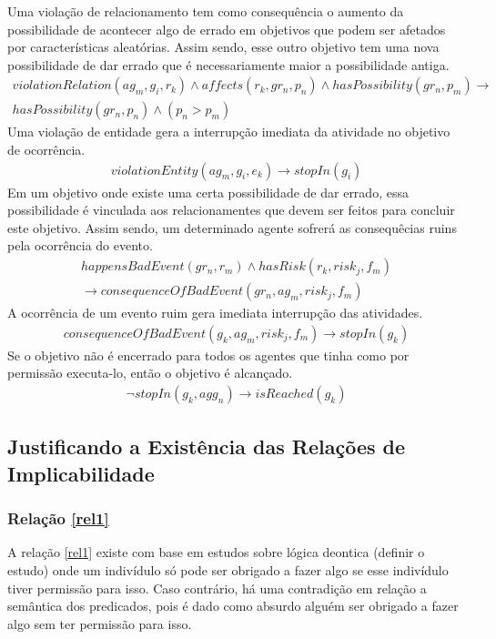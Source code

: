 \documentclass[12pt]{article}
\begin{document}
Uma violação de relacionamento tem como consequência o aumento da possibilidade de acontecer algo de errado em objetivos que podem ser afetados por características aleatórias. Assim sendo, esse outro objetivo tem uma nova possibilidade de dar errado que é necessariamente maior a possibilidade antiga.
\begin{eqnarray}\nonumber
	violationRelation(ag_m,g_i,r_k) \wedge affects(r_k,gr_n,p_n) \wedge hasPossibility(gr_n,p_m) \to \\  
	hasPossibility(gr_n,p_n) \wedge (p_n > p_m)
\end{eqnarray}
Uma violação de entidade gera a interrupção imediata da atividade no objetivo de ocorrência.
\begin{eqnarray}
	violationEntity(ag_m,g_i,e_k) \to stopIn(g_i)
\end{eqnarray}
 Em um objetivo onde existe uma certa possibilidade de dar errado, essa possibilidade é vinculada aos relacionamentes que devem ser feitos para concluir este objetivo. Assim sendo, um determinado agente sofrerá as consequêcias ruins pela ocorrência do evento.
\begin{eqnarray}\nonumber
	happensBadEvent(gr_n,r_m) \wedge hasRisk(r_k,risk_j,f_m) \nonumber \\ 
	\to consequenceOfBadEvent(gr_n,ag_m,risk_j,f_m)
\end{eqnarray}
A ocorrência de um evento ruim gera imediata interrupção das atividades.
\begin{eqnarray}
	consequenceOfBadEvent(g_k,ag_m,risk_j,f_m) \to stopIn(g_k)
\end{eqnarray}
Se o objetivo não é encerrado para todos os agentes que tinha como por permissão executa-lo, então o objetivo é alcançado. 
\begin{eqnarray}
	\neg stopIn(g_k,agg_n) \to isReached(g_k)
\end{eqnarray}


\subsection{Justificando a Existência das Relações de Implicabilidade}

\subsubsection{Relação \ref{rel1}}
A relação \ref{rel1} existe com base em estudos sobre lógica deontica (definir o estudo) onde um indivídulo só pode ser obrigado a fazer algo se esse indivídulo tiver permissão para isso. Caso contrário, há uma contradição em relação a semântica dos predicados, pois é dado como absurdo alguém ser obrigado a fazer algo sem ter permissão para isso. 
\end{document}
